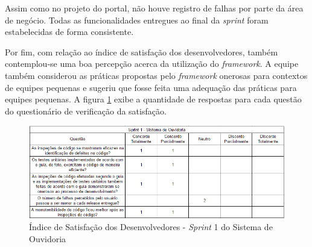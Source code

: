 Assim como no projeto do portal, não houve registro de falhas por parte da área de negócio. Todas as funcionalidades entregues ao final da \textit{sprint} foram estabelecidas de forma consistente.

Por fim, com relação ao índice de satisfação dos desenvolvedores, também contemplou-se uma boa percepção acerca da utilização do \textit{framework}. A equipe também considerou as práticas propostas pelo \textit{framework} onerosas para contextos de equipes pequenas e sugeriu que fosse feita uma adequação das práticas para equipes pequenas. A figura \ref{fig:satisfacaoOuvidoria1} exibe a quantidade de respostas para cada questão do questionário de verificação da satisfação.

\begin{figure}[h]
\includegraphics[width=\textwidth]{figuras/isd_ouvdf_1.png}
\caption{Índice de Satisfação dos Desenvolvedores - \textit{Sprint} 1 do Sistema de Ouvidoria}
\label{fig:satisfacaoOuvidoria1}
\end{figure}